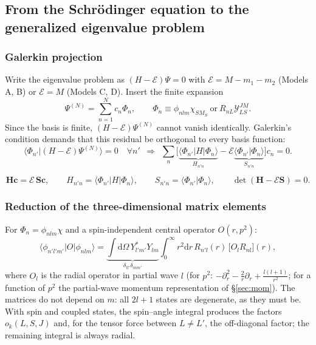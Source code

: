 \documentclass[11pt,a4paper]{article}
\numberwithin{equation}{section}
\theoremstyle{definition}
\theoremstyle{plain}
\theoremstyle{remark}
\newenvironment{keyresult}[1][Key result]{\begin{tcolorbox}[keybox,title={\small\bfseries #1},fonttitle=\small,coltitle=white,colbacktitle=MidnightBlue!70]}{\end{tcolorbox}}
\numberwithin{algorithm}{section}
\newcommand{\dd}{\mathrm{d}}
\newcommand{\braket}[2]{\langle #1|#2\rangle}
\newcommand{\ME}[3]{\langle #1|#2|#3\rangle}
\newcommand{\mH}{\mathbf H}
\newcommand{\mS}{\mathbf S}
\newcommand{\vc}{\bm c}
\newcommand{\SY}{\mathcal Y}
\begin{document}
\subsection{From the Schr\"odinger equation to the generalized eigenvalue problem}\label{sec:gep}
\subsubsection{Galerkin projection}
Write the eigenvalue problem as $(H-\mathcal E)\Psi=0$ with $\mathcal E=M-m_1-m_2$ (Models A, B) or $\mathcal E=M$ (Models C, D). Insert the finite expansion
\begin{equation}
\Psi^{(N)}=\sum_{n=1}^{N}c_n\Phi_n,\qquad \Phi_n\equiv\phi_{nlm}\chi_{SM_S}\ \text{or}\ R_{nL}\SY^{JM}_{LS}.
\end{equation}
Since the basis is finite, $(H-\mathcal E)\Psi^{(N)}$ cannot vanish identically. Galerkin's condition demands that this residual be orthogonal to every basis function:
\begin{equation}
\braket{\Phi_{n'}}{(H-\mathcal E)\Psi^{(N)}}=0\quad\forall n'
\ \ \Longrightarrow\ \
\sum_n\Big[\underbrace{\ME{\Phi_{n'}}{H}{\Phi_n}}_{H_{n'n}}-\mathcal E\underbrace{\braket{\Phi_{n'}}{\Phi_n}}_{S_{n'n}}\Big]c_n=0 .
\end{equation}
\begin{keyresult}[Generalized eigenvalue problem]
\begin{equation}
\mH\vc=\mathcal E\,\mS\vc,\qquad H_{n'n}=\ME{\Phi_{n'}}{H}{\Phi_n},\qquad S_{n'n}=\braket{\Phi_{n'}}{\Phi_n},\qquad \det(\mH-\mathcal E\mS)=0 .
\end{equation}
\end{keyresult}

\subsubsection{Reduction of the three-dimensional matrix elements}
For $\Phi_n=\phi_{nlm}\chi$ and a spin-independent central operator $O(r,p^2)$:
\begin{equation}
\ME{\phi_{n'l'm'}}{O}{\phi_{nlm}}=\underbrace{\int\dd\Omega\,Y_{l'm'}^*Y_{lm}}_{\delta_{ll'}\delta_{mm'}}\int_0^\infty r^2\dd r\,R_{n'l}(r)\,\big[O_lR_{nl}\big](r),
\end{equation}
where $O_l$ is the radial operator in partial wave $l$ (for $p^2$: $-\partial_r^2-\frac2r\partial_r+\frac{l(l+1)}{r^2}$; for a function of $p^2$ the partial-wave momentum representation of \S\ref{sec:mom}). The matrices do not depend on $m$: all $2l+1$ states are degenerate, as they must be. With spin and coupled states, the spin--angle integral produces the factors $o_k(L,S,J)$ and, for the tensor force between $L\neq L'$, the off-diagonal factor; the remaining integral is always radial.
\end{document}
